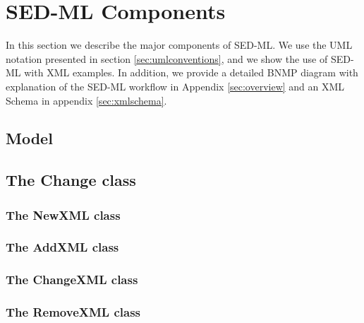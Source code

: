 
\section{SED-ML Components}
In this section we describe the major components of SED-ML. We use the UML notation presented in section \ref{sec:umlconventions}, and we show the use of SED-ML with XML examples. 
In addition, we provide a detailed BNMP diagram with explanation of the SED-ML workflow in Appendix \ref{sec:overview} and an XML Schema in appendix \ref{sec:xmlschema}. 

  \subsection{Model}
  

  \subsection[Change]{The Change class}
  

  \subsubsection[NewXML]{The NewXML class}
  

  \subsubsection[AddXML]{The AddXML class}
  

  \subsubsection[ChangeXML]{The ChangeXML class}
  

	\subsubsection[RemoveXML]{The RemoveXML class}
  

